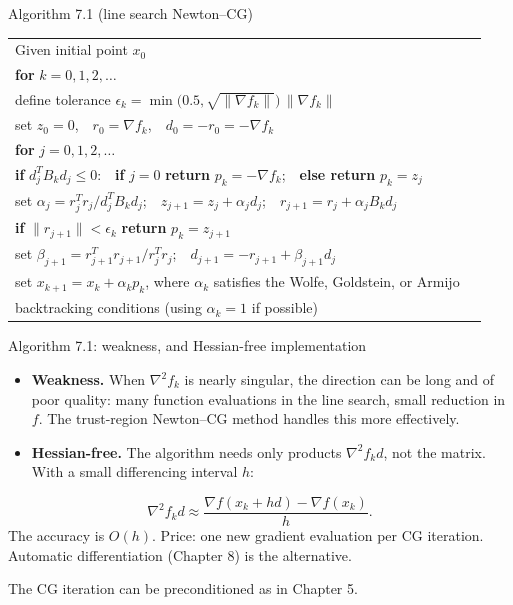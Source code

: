 \documentclass[aspectratio=169,12pt]{beamer}
\makeatletter
\newcommand{\gradf}{\nabla f}
\newcommand{\hessf}{\nabla^{2} f}
\newenvironment{algo}{\par\renewcommand{\arraystretch}{1.12}%
  \begin{tabular}{@{}l@{\hspace{2.2em}}l@{}}}{\end{tabular}\par}
\makeatother
\begin{document}
\begin{frame}{Algorithm 7.1 (line search Newton--CG)}
  \begin{block}{}\small
    \begin{algo}
      Given initial point $x_{0}$ & \\
      \textbf{for} $k=0,1,2,\dots$ & \\
      \quad define tolerance $\epsilon_{k}=\min\big(0.5,\sqrt{\|\gradf_{k}\|}\big)\,\|\gradf_{k}\|$ & \\
      \quad set $z_{0}=0$,\ \ $r_{0}=\gradf_{k}$,\ \ $d_{0}=-r_{0}=-\gradf_{k}$ & \\
      \quad \textbf{for} $j=0,1,2,\dots$ & \\
      \qquad \textbf{if} $d_{j}^{T}B_{k}d_{j}\le 0$:\ \ \textbf{if} $j=0$ \textbf{return} $p_{k}=-\gradf_{k}$;\ \
             \textbf{else return} $p_{k}=z_{j}$ & \\
      \qquad set $\alpha_{j}=r_{j}^{T}r_{j}/d_{j}^{T}B_{k}d_{j}$;\ \ $z_{j+1}=z_{j}+\alpha_{j}d_{j}$;\ \
             $r_{j+1}=r_{j}+\alpha_{j}B_{k}d_{j}$ & \\
      \qquad \textbf{if} $\|r_{j+1}\|<\epsilon_{k}$ \textbf{return} $p_{k}=z_{j+1}$ & \\
      \qquad set $\beta_{j+1}=r_{j+1}^{T}r_{j+1}/r_{j}^{T}r_{j}$;\ \ $d_{j+1}=-r_{j+1}+\beta_{j+1}d_{j}$ & \\
      \quad set $x_{k+1}=x_{k}+\alpha_{k}p_{k}$, where $\alpha_{k}$ satisfies the Wolfe, Goldstein, or
            Armijo & \\
      \qquad backtracking conditions (using $\alpha_{k}=1$ if possible) & \\
    \end{algo}
  \end{block}
\end{frame}

\begin{frame}{Algorithm 7.1: weakness, and Hessian-free implementation}
  \begin{itemize}\setlength\itemsep{0.5em}
    \item \textbf{Weakness.} When $\hessf_{k}$ is nearly singular, the direction can be long and
      of poor quality: many function evaluations in the line search, small reduction in $f$.
      The trust-region Newton--CG method handles this more effectively.
    \item \textbf{Hessian-free.} The algorithm needs only products $\hessf_{k}d$, not the matrix.
      With a small differencing interval $h$:
  \end{itemize}
  \[ \hessf_{k}d\approx\frac{\gradf(x_{k}+hd)-\gradf(x_{k})}{h} . \tag{7.10} \]
  The accuracy is $O(h)$. Price: \alert{one new gradient evaluation per CG iteration}.\\
  Automatic differentiation (Chapter 8) is the alternative.

  \vspace{0.5em}
  The CG iteration can be preconditioned as in Chapter 5.
\end{frame}
\end{document}
